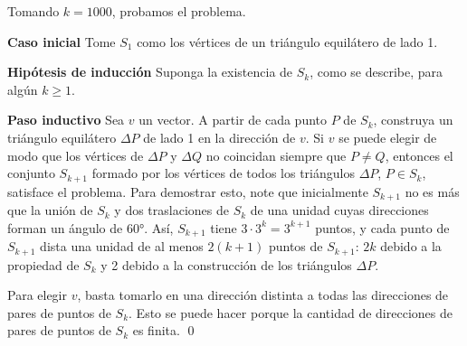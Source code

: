 \documentclass[11pt]{scrartcl}
\begin{document}
Tomando \( k = 1000 \), probamos el problema.

\textbf{Caso inicial}
Tome \( S_1 \) como los vértices de un triángulo equilátero de lado 1.

\textbf{Hipótesis de inducción}
Suponga la existencia de \( S_k \), como se describe, para algún \( k \geq 1 \).

\textbf{Paso inductivo}
Sea \( v \) un vector. A partir de cada punto \( P \) de \( S_k \), construya un triángulo equilátero \( \Delta P \) de lado 1 en la dirección de \( v \). Si \( v \) se puede elegir de modo que los vértices de \( \Delta P \) y \( \Delta Q \) no coincidan siempre que \( P \neq Q \), entonces el conjunto \( S_{k+1} \) formado por los vértices de todos los triángulos \( \Delta P \), \( P \in S_k \), satisface el problema. Para demostrar esto, note que inicialmente \( S_{k+1} \) no es más que la unión de \( S_k \) y dos traslaciones de \( S_k \) de una unidad cuyas direcciones forman un ángulo de 60°. Así, \( S_{k+1} \) tiene \( 3 \cdot 3^k = 3^{k+1} \) puntos, y cada punto de \( S_{k+1} \) dista una unidad de al menos \( 2(k + 1) \) puntos de \( S_{k+1} \): \( 2k \) debido a la propiedad de \( S_k \) y 2 debido a la construcción de los triángulos \( \Delta P \).

Para elegir \( v \), basta tomarlo en una dirección distinta a todas las direcciones de pares de puntos de \( S_k \). Esto se puede hacer porque la cantidad de direcciones de pares de puntos de \( S_k \) es finita. \qed
\end{document}
